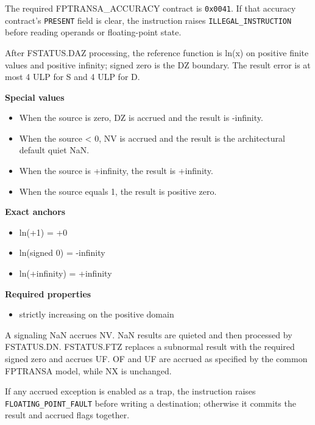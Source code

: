 The required FPTRANSA\_ACCURACY contract is \texttt{0x0041}. If that accuracy contract's \texttt{PRESENT} field is clear, the instruction raises \texttt{ILLEGAL\_INSTRUCTION} before reading operands or floating-point state.

After FSTATUS.DAZ processing, the reference function is ln(x) on positive finite values and positive infinity; signed zero is the DZ boundary. The result error is at most 4 ULP for S and 4 ULP for D.

\textbf{Special values}\par
\begin{itemize}
\item When the source is zero, DZ is accrued and the result is -infinity.
\item When the source \textless{} 0, NV is accrued and the result is the architectural default quiet NaN.
\item When the source is +infinity, the result is +infinity.
\item When the source equals 1, the result is positive zero.
\end{itemize}

\textbf{Exact anchors}\par
\begin{itemize}
\item ln(+1) = +0
\item ln(signed 0) = -infinity
\item ln(+infinity) = +infinity
\end{itemize}

\textbf{Required properties}\par
\begin{itemize}
\item strictly increasing on the positive domain
\end{itemize}

A signaling NaN accrues NV. NaN results are quieted and then processed by FSTATUS.DN. FSTATUS.FTZ replaces a subnormal result with the required signed zero and accrues UF. OF and UF are accrued as specified by the common FPTRANSA model, while NX is unchanged.

If any accrued exception is enabled as a trap, the instruction raises \texttt{FLOATING\_POINT\_FAULT} before writing a destination; otherwise it commits the result and accrued flags together.
